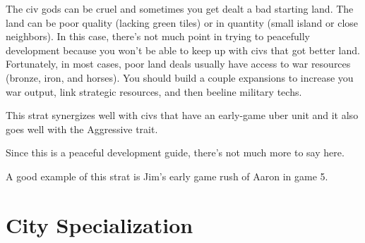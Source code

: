 \documentclass[10pt]{article}
\begin{document}
The civ gods can be cruel and sometimes you get dealt a bad starting land. The land can be poor quality (lacking
green tiles) or in quantity (small island or close neighbors). In this case, there's not much point in trying
to peacefully development because you won't be able to keep up with civs that got better land. Fortunately, in most cases,
poor land deals usually have access to war resources (bronze, iron, and horses). You should build a couple expansions
to increase you war output, link strategic resources, and then beeline military techs.

This strat synergizes well with civs that have an early-game uber unit and it also goes well with the Aggressive trait.

Since this is a peaceful development guide, there's not much more to say here.

A good example of this strat is Jim's early game rush of Aaron in game 5.

\section*{City Specialization}
\end{document}
